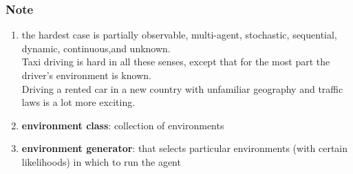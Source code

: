 \subsubsection*{Note}
\begin{enumerate}
    \item the hardest case is partially observable, multi-agent, stochastic, sequential, dynamic, continuous,and unknown.\\
    Taxi driving is hard in all these senses, except that for the most part the driver’s environment is known.\\
    Driving a rented car in a new country with unfamiliar geography and traffic laws is a lot more exciting. 

    \item \textbf{environment class}: collection of environments

    \item \textbf{environment generator}: that selects particular environments (with certain likelihoods) in which to run the agent
\end{enumerate}

